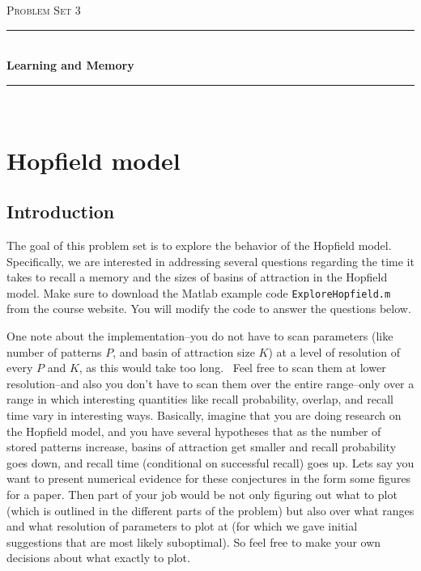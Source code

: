 \documentclass[letterpaper,11pt]{article}
\newcommand{\HRule}{\rule{\linewidth}{0.5mm}}
\begin{document}
\begin{center}
\thispagestyle{empty}

\textsc{\Large Problem Set 3}\\[0.5cm]

\HRule \\[0.6cm]
{ \huge \bfseries Learning and Memory}\\[0.2cm]

\HRule \\[2.5cm]

\end{center}

\section{Hopfield model}
\subsection*{Introduction}
The goal of this problem set is to explore the behavior of the Hopfield model.
Specifically, we are interested in addressing several questions regarding the time it takes to recall a memory and the sizes of basins of attraction in the Hopfield model. 
Make sure to download the Matlab example code \texttt{ExploreHopfield.m} from the course website.
You will modify the code to answer the questions below.

One note about the implementation--you do not have to scan parameters (like number of patterns $P$, and basin of attraction size $K$) at a level of resolution of every $P$ and $K$, as this would take too long.  Feel free to scan them at lower resolution--and also you don't have to scan them over the entire range--only over a range in which interesting quantities like recall probability, overlap, and recall time vary in interesting ways.
Basically, imagine that you are doing research on the Hopfield model, and you have several hypotheses that as the number of stored patterns increase, basins of attraction get smaller and recall probability goes down, and recall time (conditional on successful recall) goes up.
Lets say you want to present numerical evidence for these conjectures in the form some figures for a paper.
Then part of your job would be not only figuring out what to plot (which is outlined in the different parts of the problem) but also over what ranges and what resolution of parameters to plot at (for which we gave initial suggestions that are most likely suboptimal).
So feel free to make your own decisions about what exactly to plot.
\end{document}
